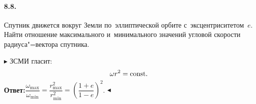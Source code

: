\documentclass{weekly}
\begin{document}

\paragraph{8.8.} Спутник движется вокруг Земли по~эллиптической орбите
с~эксцентриситетом~$e$. Найти отношение максимального и~минимального
значений угловой скорости радиуса"=вектора спутника.

$\blacktriangleright$ ЗСМИ гласит:
\begin{equation}
    \omega r^2 = \mathrm{const}.
\end{equation}
\textbf{Ответ:}\qquad $\dfrac{\omega_{\max}}{\omega_{\min}} =
\dfrac{r_{\max}^2}{r_{\min}^2} = \left(\dfrac{1+e}{1-e}\right)^2$.
\hfill $\blacktriangleleft$
\end{document}
